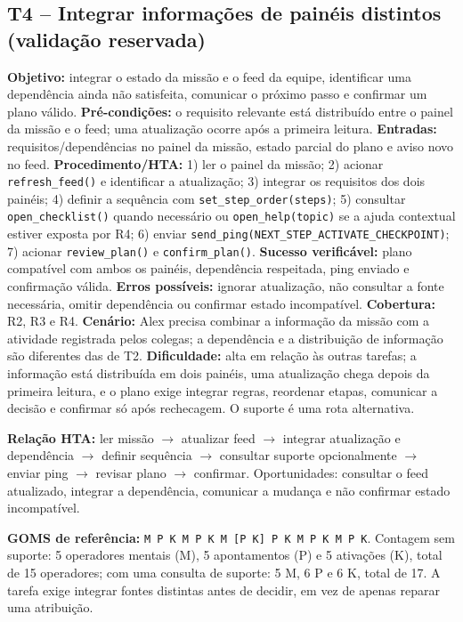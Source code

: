 \documentclass[conference]{IEEEtran}
\begin{document}
\subsection{T4 -- Integrar informações de painéis distintos (validação reservada)}
\textbf{Objetivo:} integrar o estado da missão e o feed da equipe, identificar uma dependência ainda não satisfeita, comunicar o próximo passo e confirmar um plano válido. \textbf{Pré-condições:} o requisito relevante está distribuído entre o painel da missão e o feed; uma atualização ocorre após a primeira leitura. \textbf{Entradas:} requisitos/dependências no painel da missão, estado parcial do plano e aviso novo no feed. \textbf{Procedimento/HTA:} 1) ler o painel da missão; 2) acionar \texttt{refresh\_feed()} e identificar a atualização; 3) integrar os requisitos dos dois painéis; 4) definir a sequência com \texttt{set\_step\_order(steps)}; 5) consultar \texttt{open\_checklist()} quando necessário ou \texttt{open\_help(topic)} se a ajuda contextual estiver exposta por R4; 6) enviar \texttt{send\_ping(NEXT\_STEP\_ACTIVATE\_CHECKPOINT)}; 7) acionar \texttt{review\_plan()} e \texttt{confirm\_plan()}. \textbf{Sucesso verificável:} plano compatível com ambos os painéis, dependência respeitada, ping enviado e confirmação válida. \textbf{Erros possíveis:} ignorar atualização, não consultar a fonte necessária, omitir dependência ou confirmar estado incompatível. \textbf{Cobertura:} R2, R3 e R4. \textbf{Cenário:} Alex precisa combinar a informação da missão com a atividade registrada pelos colegas; a dependência e a distribuição de informação são diferentes das de T2. \textbf{Dificuldade:} alta em relação às outras tarefas; a informação está distribuída em dois painéis, uma atualização chega depois da primeira leitura, e o plano exige integrar regras, reordenar etapas, comunicar a decisão e confirmar só após rechecagem. O suporte é uma rota alternativa.

\textbf{Relação HTA:} ler missão $\rightarrow$ atualizar feed $\rightarrow$ integrar atualização e dependência $\rightarrow$ definir sequência $\rightarrow$ consultar suporte opcionalmente $\rightarrow$ enviar ping $\rightarrow$ revisar plano $\rightarrow$ confirmar. Oportunidades: consultar o feed atualizado, integrar a dependência, comunicar a mudança e não confirmar estado incompatível.

\textbf{GOMS de referência:} \texttt{M P K M P K M [P K] P K M P K M P K}. Contagem sem suporte: 5 operadores mentais (M), 5 apontamentos (P) e 5 ativações (K), total de 15 operadores; com uma consulta de suporte: 5 M, 6 P e 6 K, total de 17. A tarefa exige integrar fontes distintas antes de decidir, em vez de apenas reparar uma atribuição.
\end{document}
